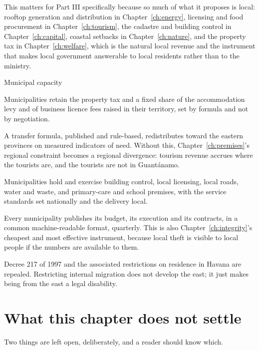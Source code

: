 This matters for Part III specifically because so much of what it proposes is
local: rooftop generation and distribution in Chapter~\ref{ch:energy}, licensing
and food procurement in Chapter~\ref{ch:tourism}, the cadastre and building
control in Chapter~\ref{ch:capital}, coastal setbacks in
Chapter~\ref{ch:nature}, and the property tax in Chapter~\ref{ch:welfare}, which
is the natural local revenue and the instrument that makes local government
answerable to local residents rather than to the ministry.

\begin{design}{Municipal capacity}
\label{d:municipal}
\begin{rules}
 Municipalities retain the property tax and a fixed share of
the accommodation levy and of business licence fees raised in their territory,
set by formula and not by negotiation.

 A transfer formula, published and rule-based, redistributes
toward the eastern provinces on measured indicators of need. Without this,
Chapter~\ref{ch:premises}'s regional constraint becomes a regional divergence:
tourism revenue accrues where the tourists are, and the tourists are not in
Guant\'anamo.

 Municipalities hold and exercise building control, local
licensing, local roads, water and waste, and primary-care and school premises,
with the service standards set nationally and the delivery local.

 Every municipality publishes its budget, its execution and
its contracts, in a common machine-readable format, quarterly. This is also
Chapter~\ref{ch:integrity}'s cheapest and most effective instrument, because
local theft is visible to local people if the numbers are available to them.

 Decree 217 of 1997 and the associated restrictions on
residence in Havana are repealed. Restricting internal migration does not
develop the east; it just makes being from the east a legal disability.
\end{rules}
\end{design}

\section{What this chapter does not settle}

Two things are left open, deliberately, and a reader should know which.

